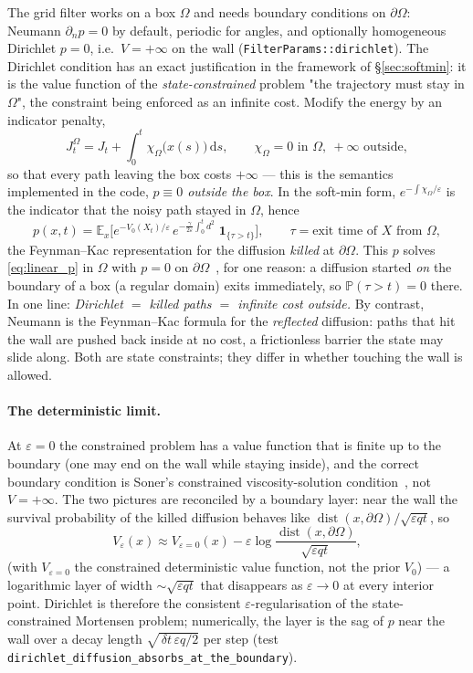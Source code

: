 \documentclass[11pt,a4paper]{article}
\newcommand{\dd}{\,\mathrm{d}}
\newcommand{\eps}{\varepsilon}
\newcommand{\dt}{\,\delta t}
\theoremstyle{plain}
\theoremstyle{definition}
\theoremstyle{remark}
\begin{document}
The grid filter works on a box $\Omega$ and needs boundary conditions on $\partial\Omega$: Neumann $\partial_n p=0$ by default, periodic for angles, and optionally homogeneous Dirichlet $p=0$, i.e.\ $V=+\infty$ on the wall (\texttt{FilterParams::dirichlet}). The Dirichlet condition has an exact justification in the framework of \S\ref{sec:softmin}: it is the value function of the \emph{state-constrained} problem "the trajectory must stay in $\Omega$", the constraint being enforced as an infinite cost. Modify the energy by an indicator penalty,
\[
  J_t^{\Omega} = J_t + \int_0^t \chi_\Omega\big(x(s)\big)\dd s, \qquad \chi_\Omega = 0 \text{ in }\Omega,\ +\infty\text{ outside},
\]
so that every path leaving the box costs $+\infty$ --- this is the semantics implemented in the code, \emph{$p\equiv0$ outside the box}. In the soft-min form, $e^{-\int\chi_\Omega/\eps}$ is the indicator that the noisy path stayed in $\Omega$, hence
\[
  p(x,t) = \mathbb E_x\Big[ e^{-V_0(X_t)/\eps}\, e^{-\frac{\gamma}{2\eps}\int_0^t d^2}\; \mathbf 1_{\{\tau>t\}}\Big], \qquad \tau = \text{exit time of }X\text{ from }\Omega,
\]
the Feynman--Kac representation for the diffusion \emph{killed} at $\partial\Omega$. This $p$ solves \eqref{eq:linear_p} in $\Omega$ with $p=0$ on $\partial\Omega$~\cite{Freidlin1985}, for one reason: a diffusion started \emph{on} the boundary of a box (a regular domain) exits immediately, so $\mathbb P(\tau>t)=0$ there. In one line: \emph{Dirichlet $=$ killed paths $=$ infinite cost outside.} By contrast, Neumann is the Feynman--Kac formula for the \emph{reflected} diffusion: paths that hit the wall are pushed back inside at no cost, a frictionless barrier the state may slide along. Both are state constraints; they differ in whether touching the wall is allowed.

\paragraph{The deterministic limit.}
At $\eps=0$ the constrained problem has a value function that is finite up to the boundary (one may end on the wall while staying inside), and the correct boundary condition is Soner's constrained viscosity-solution condition~\cite{Soner1986}, not $V=+\infty$. The two pictures are reconciled by a boundary layer: near the wall the survival probability of the killed diffusion behaves like $\operatorname{dist}(x,\partial\Omega)/\sqrt{\eps q t}$, so
\[
  V_\eps(x) \approx V_{\eps=0}(x) - \eps\log\frac{\operatorname{dist}(x,\partial\Omega)}{\sqrt{\eps q t}},
\]
(with $V_{\eps=0}$ the constrained deterministic value function, not the prior $V_0$) --- a logarithmic layer of width $\sim\sqrt{\eps q t}$ that disappears as $\eps\to0$ at every interior point. Dirichlet is therefore the consistent $\eps$-regularisation of the state-constrained Mortensen problem; numerically, the layer is the sag of $p$ near the wall over a decay length $\sqrt{\dt\,\eps q/2}$ per step (test \texttt{dirichlet\_diffusion\_absorbs\_at\_the\_boundary}).
\end{document}
